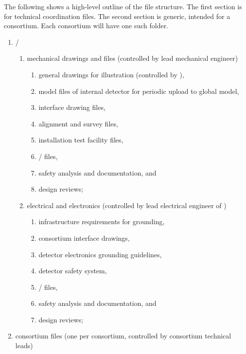 The following shows a high-level outline of the file structure. The
first section is for technical coordination files. The second
section is generic, intended for a consortium. Each consortium will have one such
folder.
\begin{enumerate}
 \item {}/  %
 \begin{enumerate}
  \item mechanical drawings and files (controlled by  lead mechanical engineer)
  
  \begin{enumerate}
    \item {} general drawings for illustration (controlled by ),
    \item \threed model files of internal detector for periodic upload to global model,
    \item \twod interface drawing files,
    \item alignment and survey files,
    \item {} installation test facility files,
    \item {}/ files,
    \item safety analysis and documentation, and 
    \item design reviews;
  \end{enumerate}
  
  \item electrical and electronics (controlled by lead electrical engineer of )
  \begin{enumerate}
    \item infrastructure requirements for grounding,
    \item consortium interface drawings,
    \item detector electronics grounding guidelines,
    \item detector safety system,
    \item {}/ files,
    \item safety analysis and documentation, and 
      \item design reviews;
  \end{enumerate}
  
 \end{enumerate}

 \item consortium files (one per consortium, controlled by consortium technical leads)   %


\end{enumerate}
